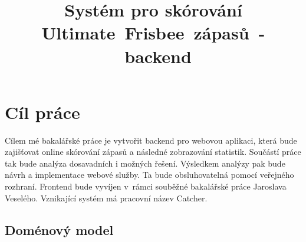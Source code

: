 \documentclass[thesis=B,czech]{FITthesis}[2012/06/26]
\title{Systém pro skórování Ultimate~Frisbee~zápasů~-~backend}
\begin{document}
 
 
 
 \begin{introduction}
 \end{introduction}
 
 \chapter{Cíl práce}
 
 Cílem mé bakalářské práce je vytvořit backend pro webovou aplikaci, která bude zajišťovat online
 skórování zápasů a následné zobrazování statistik. Sou\-částí práce tak bude analýza dosavadních
 i možných řešení. Výsledkem analýzy pak bude návrh a implementace webové služby. Ta bude obsluhovatelná
 pomocí veřejného rozhraní. Frontend bude vyvíjen v~rámci souběžné bakalářské práce Jaroslava Veselého.
 Vznikající systém má pracovní název Catcher.

 

 

 




\section{Doménový model}
\end{document}
